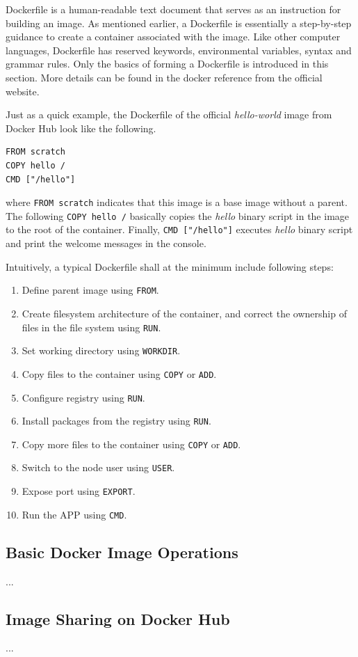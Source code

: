 Dockerfile is a human-readable text document that serves as an instruction for building an image. As mentioned earlier, a Dockerfile is essentially a step-by-step guidance to create a container associated with the image. Like other computer languages, Dockerfile has reserved keywords, environmental variables, syntax and grammar rules. Only the basics of forming a Dockerfile is introduced in this section. More details can be found in the docker reference from the official website.

Just as a quick example, the Dockerfile of the official \textit{hello-world} image from Docker Hub look like the following.
\begin{lstlisting}
FROM scratch
COPY hello /
CMD ["/hello"]
\end{lstlisting}
where \verb|FROM scratch| indicates that this image is a base image without a parent. The following \verb|COPY hello /| basically copies the \textit{hello} binary script in the image to the root of the container. Finally, \verb|CMD ["/hello"]| executes \textit{hello} binary script and print the welcome messages in the console.

Intuitively, a typical Dockerfile shall at the minimum include following steps:
\begin{enumerate}[(1)]
  \item Define parent image using \verb|FROM|.
  \item Create filesystem architecture of the container, and correct the ownership of files in the file system using \verb|RUN|.
  \item Set working directory using \verb|WORKDIR|.
  \item Copy files to the container using \verb|COPY| or \verb|ADD|.
  \item Configure registry using \verb|RUN|.
  \item Install packages from the registry using \verb|RUN|.
  \item Copy more files to the container using \verb|COPY| or \verb|ADD|.
  \item Switch to the node user using \verb|USER|.
  \item Expose port using \verb|EXPORT|.
  \item Run the APP using \verb|CMD|.
\end{enumerate}

\subsection{Basic Docker Image Operations}

...

\subsection{Image Sharing on Docker Hub}


...
















